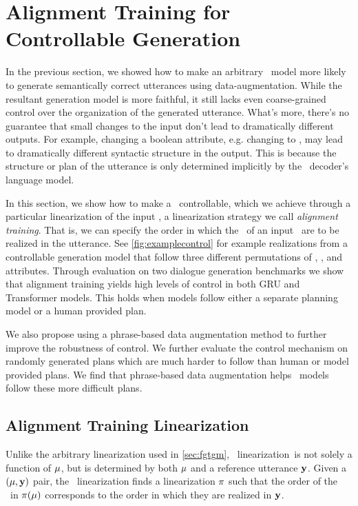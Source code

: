 \section{Alignment Training for Controllable Generation}
\label{sec:nlgcg}

In the previous section, we showed how to make an arbitrary
\sequencetosequence~model more likely to generate semantically correct
utterances using data-augmentation. While the resultant generation model is
more faithful, it still lacks even coarse-grained control over the organization
of the generated utterance.  What's more, there's no guarantee that small
changes to the input don't lead to dramatically different outputs.  For
example, changing a boolean attribute, e.g. changing
 to
, may lead to dramatically different
syntactic structure in the output.  This is because the structure or plan of
the utterance is only determined implicitly by the
\sequencetosequence~decoder's language model.

In this section, we show how to make a \sequencetosequence~controllable, which
we achieve through a particular linearization of the input
\meaningrepresentation, a linearization strategy we call \textit{alignment
training}. That is, we can specify the order in which the \attributevalues~of
an input \meaningrepresentation~are to be realized in the utterance.  See
\autoref{fig:examplecontrol} for example realizations from a controllable
generation model that follow three different permutations of ,
, and  attributes.  Through evaluation on two dialogue
generation benchmarks we show that alignment training yields high levels of
control in both GRU and Transformer models. This holds when models follow
either a separate planning model or a human provided plan.

We also propose using a phrase-based data augmentation method to further
improve the robustness of control. We further evaluate the control mechanism on
randomly generated plans which are much harder to follow than human or model
provided plans. We find that phrase-based data augmentation helps
\sequencetosequence~models follow these more difficult plans.

\subsection{Alignment Training Linearization}

Unlike the arbitrary linearization used in \autoref{sec:fgtgm},
\alignmenttraining~linearization~is not solely a function of $\mu$, but is
determined by both $\mu$ and a reference utterance $\mathbf{y}$. Given a
$\left(\mu, \mathbf{y}\right)$ pair, the \alignmenttraining~linearization finds a
linearization $\pi$ such that the order of the \attributevalues~in $\pi(\mu)$
corresponds to the order in which they are realized in $\mathbf{y}$. 


